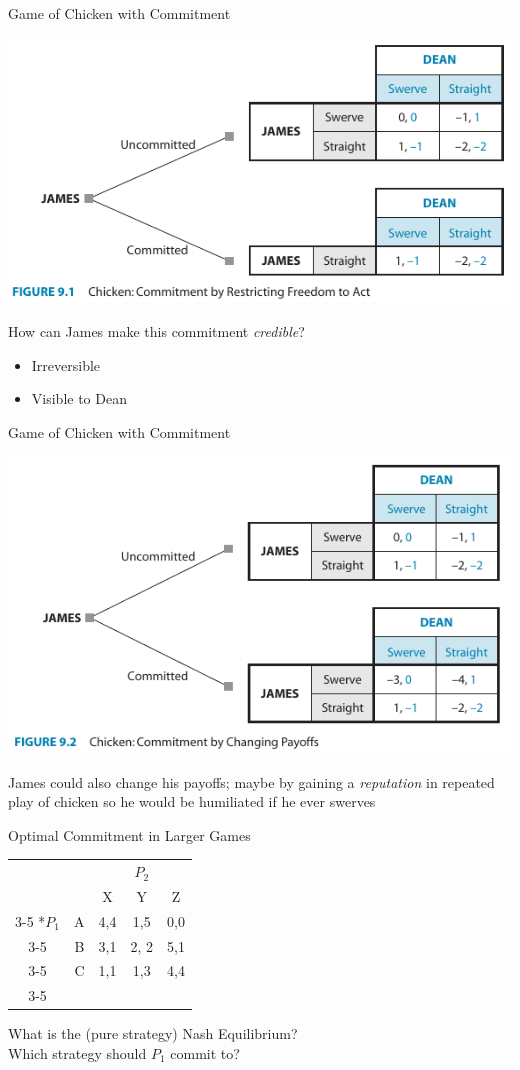 \begin{frame}{Game of Chicken with Commitment}
  \begin{center}
    \includegraphics[width=.6\textwidth]{figures/fig91.png} 
  \end{center} 
  How can James make this commitment \textit{credible}?
  \begin{itemize}
    \item Irreversible 
    \item Visible to Dean
  \end{itemize}
\end{frame}


\begin{frame}{Game of Chicken with Commitment}
  \begin{center}
    \includegraphics[width=.8\textwidth]{figures/fig92.png} 
  \end{center} 
  James could also change his payoffs; maybe by gaining a \textit{reputation} 
  in repeated play of chicken so he would be humiliated if he ever swerves
\end{frame}

\begin{frame}{Optimal Commitment in Larger Games}
  \begin{table}[!h]
		\centering
		\begin{tabular}{cr|c|c|c|}
			& \multicolumn{1}{c}{} & \multicolumn{3}{c}{$P_2$}\\
      & \multicolumn{1}{c}{} & \multicolumn{1}{c}{X} & \multicolumn{1}{c}{Y} & \multicolumn{1}{c}{Z} \\\cline{3-5}
      \multirow{3}*{$P_1$} & A & 4,4 & 1,5 & 0,0 \\\cline{3-5}
      & B & 3,1 & 2, 2 & 5,1 \\\cline{3-5}
      & C & 1,1 & 1,3 & 4,4 \\\cline{3-5}
		\end{tabular}
	\end{table}
  What is the (pure strategy) Nash Equilibrium? \\
  Which strategy should $P_1$ commit to? 
\end{frame}
